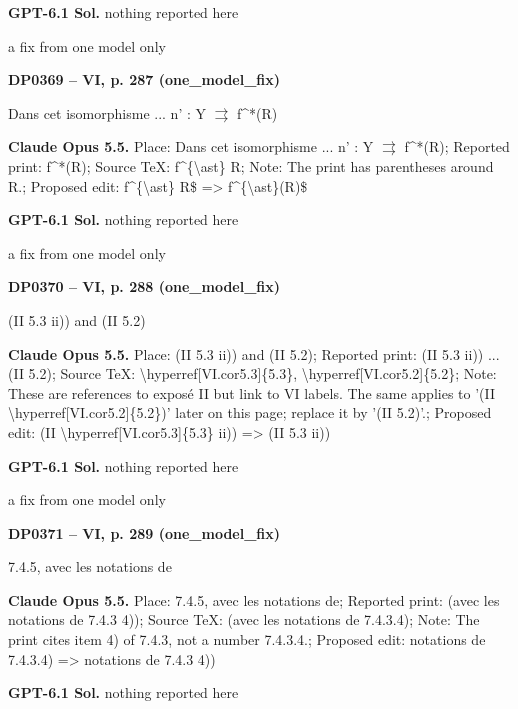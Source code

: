 \textbf{GPT-6.1 Sol.} nothing reported here\par
a fix from one model only\par
\par\noindent\hypertarget{DP0369}{}\textbf{DP0369 -- VI, p. 287 (one\_model\_fix)}\par
Dans cet isomorphisme ... n' : Y \ensuremath{\rightrightarrows} f\textasciicircum{}*(R)\par
\textbf{Claude Opus 5.5.} Place: Dans cet isomorphisme ... n' : Y \ensuremath{\rightrightarrows} f\textasciicircum{}*(R); Reported print: f\textasciicircum{}*(R); Source TeX: f\textasciicircum{}\{\textbackslash{}ast\} R; Note: The print has parentheses around R.; Proposed edit: f\textasciicircum{}\{\textbackslash{}ast\} R\$ =\allowbreak > f\textasciicircum{}\{\textbackslash{}ast\}(R)\$\par
\textbf{GPT-6.1 Sol.} nothing reported here\par
a fix from one model only\par
\par\noindent\hypertarget{DP0370}{}\textbf{DP0370 -- VI, p. 288 (one\_model\_fix)}\par
(II 5.3 ii)) and (II 5.2)\par
\textbf{Claude Opus 5.5.} Place: (II 5.3 ii)) and (II 5.2); Reported print: (II 5.3 ii)) ... (II 5.2); Source TeX: \textbackslash{}hyperref[VI.cor5.3]\{5.3\}, \textbackslash{}hyperref[VI.cor5.2]\{5.2\}; Note: These are references to exposé II but link to VI labels. The same applies to '(II \textbackslash{}hyperref[VI.cor5.2]\{5.2\})' later on this page; replace it by '(II 5.2)'.; Proposed edit: (II \textbackslash{}hyperref[VI.cor5.3]\{5.3\} ii)) =\allowbreak > (II 5.3 ii))\par
\textbf{GPT-6.1 Sol.} nothing reported here\par
a fix from one model only\par
\par\noindent\hypertarget{DP0371}{}\textbf{DP0371 -- VI, p. 289 (one\_model\_fix)}\par
7.4.5, avec les notations de\par
\textbf{Claude Opus 5.5.} Place: 7.4.5, avec les notations de; Reported print: (avec les notations de 7.4.3 4)); Source TeX: (avec les notations de 7.4.3.4); Note: The print cites item 4) of 7.4.3, not a number 7.4.3.4.; Proposed edit: notations de 7.4.3.4) =\allowbreak > notations de 7.4.3 4))\par
\textbf{GPT-6.1 Sol.} nothing reported here\par
